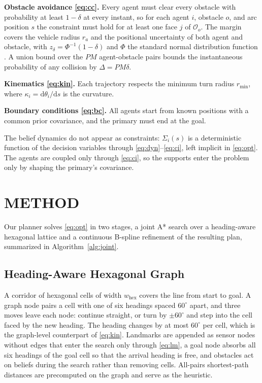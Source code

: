 \documentclass[letterpaper, 10 pt, conference]{ieeeconf}
\theoremstyle{remark}
\begin{document}
\textbf{Obstacle avoidance \eqref{eq:cc}.} Every agent must clear every
obstacle with probability at least $1-\delta$ at every instant, so for each
agent $i$, obstacle $o$, and arc position $s$ the constraint must hold for at
least one face $j$ of $\mathcal{O}_o$. The margin covers the vehicle radius
$r_a$ and the positional uncertainty of both agent and obstacle, with
$z_\delta = \Phi^{-1}(1-\delta)$ and $\Phi$ the standard normal distribution
function \cite{blackmore2011chance}. A union bound over the $PM$
agent-obstacle pairs bounds the instantaneous probability of any collision by
$\Delta = PM\delta$.

\textbf{Kinematics \eqref{eq:kin}.} Each trajectory respects the minimum
turn radius $r_{\min}$, where $\kappa_i = \mathrm{d}\theta_i/\mathrm{d}s$ is
the curvature.

\textbf{Boundary conditions \eqref{eq:bc}.} All agents start from known
positions with a common prior covariance, and the primary must end at the
goal.

The belief dynamics do not appear as constraints: $\Sigma_i(s)$ is a
deterministic function of the decision variables through
\eqref{eq:dyn}--\eqref{eq:ci}, left implicit in \eqref{eq:opt}. The agents
are coupled only through \eqref{eq:ci}, so the supports enter the problem
only by shaping the primary's covariance.

\section{METHOD}
\label{sec:method}
Our planner solves \eqref{eq:opt} in two stages, a joint A* search over a
heading-aware hexagonal lattice and a continuous B-spline refinement of the
resulting plan, summarized in Algorithm~\ref{alg:joint}.

\subsection{Heading-Aware Hexagonal Graph}

A corridor of hexagonal cells \cite{duszak2021hexgrid} of width
$w_{\mathrm{hex}}$ covers the line from start to goal. A graph node pairs a
cell with
one of six headings spaced $60^\circ$ apart, and three moves leave each
node: continue straight, or turn by $\pm 60^\circ$ and step into the cell
faced by the new heading. The heading changes by at most $60^\circ$ per
cell, which is the graph-level counterpart of \eqref{eq:kin}. Landmarks are
appended as sensor nodes without edges that enter the search only through
\eqref{eq:lm}, a goal node absorbs all six headings of the goal cell so that
the arrival heading is free, and obstacles act on beliefs during the search
rather than removing cells. All-pairs shortest-path distances are
precomputed on the graph and serve as the heuristic.
\end{document}
